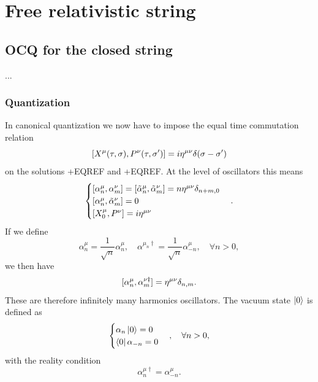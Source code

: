 \chapter{Free relativistic string}
\section{OCQ for the closed string}
... 

\subsection{Quantization}
In canonical quantization we now have to impose the equal time commutation relation
\begin{equation}
    [X^\mu(\tau,\sigma),P^\nu(\tau,\sigma')] = i\eta^{\mu\nu}\delta(\sigma - \sigma')
\end{equation}
on the solutions +EQREF and +EQREF. At the level of oscillators this means 
\begin{equation}
    \begin{cases}
        \comm{\alpha^\mu_n}{\alpha^\nu_m} = \comm{\t{\alpha}^\mu_n}{\t{\alpha}^\nu_m} = n\eta^{\mu\nu}\delta_{n + m,0} \\
        \comm{\alpha^\mu_n}{\t{\alpha}^\nu_m} = 0 \\
        \comm{X_0^\mu}{P^\nu} = i\eta^{\mu\nu}
    \end{cases}.
\end{equation}
If we define 
\begin{equation}
    \alpha^\mu_n = \frac{1}{\sqrt{n}}\alpha^\mu_n,\quad\alpha^{\mu_n\dag} = \frac{1}{\sqrt{n}}\alpha^\mu_{-n},\quad\forall n > 0,
\end{equation}
we then have 
\begin{equation}
    [\alpha^\mu_n,\alpha^{\nu\dag}_m] = \eta^{\mu\nu}\delta_{n,m}.
\end{equation}
These are therefore infinitely many harmonics oscillators. The vacuum state $\ket{0}$ is defined as 
\begin{equation}
    \begin{cases}
        \alpha_n\ket{0} = 0 \\
        \bra{0}\alpha_{-n} = 0
    \end{cases},\quad\forall n > 0,
\end{equation}
with the reality condition 
\begin{equation}
    \alpha^{\mu\dag}_n = \alpha^\mu_{-n}.
\end{equation}
